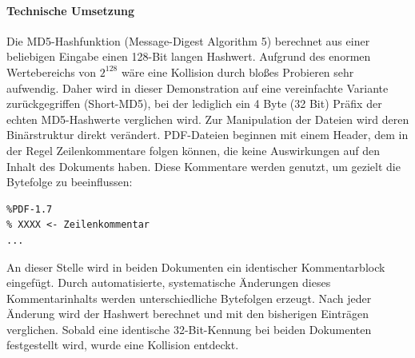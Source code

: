 \paragraph{Technische Umsetzung} Die MD5-Hashfunktion (Message-Digest Algorithm 5) berechnet aus einer beliebigen 
Eingabe einen 128-Bit langen Hashwert. Aufgrund des enormen Wertebereichs 
von $2^{128}$ wäre eine Kollision durch bloßes Probieren sehr aufwendig. Daher wird 
in dieser Demonstration auf eine vereinfachte Variante zurückgegriffen (Short-MD5),
bei der lediglich ein 4 Byte (32 Bit) Präfix  
der echten MD5-Hashwerte verglichen wird.
Zur Manipulation der Dateien wird deren Binärstruktur direkt verändert. 
PDF-Dateien beginnen mit einem Header, dem in der Regel Zeilenkommentare 
folgen können, die keine Auswirkungen auf den Inhalt des Dokuments haben. Diese 
Kommentare werden genutzt, um gezielt die Bytefolge zu beeinflussen:
\begin{verbatim}
%PDF-1.7
% XXXX <- Zeilenkommentar
...
\end{verbatim}
An dieser Stelle wird in beiden Dokumenten ein identischer Kommentarblock eingefügt. 
Durch automatisierte, systematische Änderungen dieses Kommentarinhalts werden 
unterschiedliche Bytefolgen erzeugt. Nach jeder Änderung wird der Hashwert berechnet 
und mit den bisherigen Einträgen verglichen. Sobald eine identische 32-Bit-Kennung 
bei beiden Dokumenten festgestellt wird, wurde eine Kollision entdeckt.
